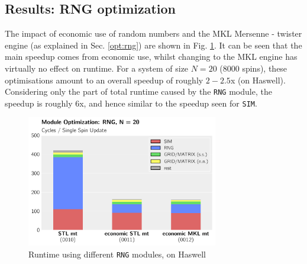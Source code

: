 \documentclass[letterpaper]{article}
\begin{document}
\subsection{Results: RNG optimization}\label{res:RNG}
The impact of economic use of random numbers and the MKL Mersenne - twister engine (as explained in Sec. \ref{opt:rng}) are shown in Fig. \ref{RNG:Has:20}. \newline
It can be seen that the main speedup comes from economic use, whilst changing to the MKL engine has virtually no effect on runtime. \newline
For a system of size $N = 20$ ($8000$ spins), these optimisations amount to an overall speedup of roughly $2 - 2.5$x (on Haswell). Considering only the part of total runtime caused by the \texttt{RNG} module, the speedup is roughly $6$x, and hence similar to the speedup seen for \texttt{SIM}.
	\begin{figure}[h]\centering
	  \includegraphics[width = 8.36cm]{plots/dg_20_0.pdf}
	  \caption{Runtime using different \texttt{RNG} modules, on Haswell}
	  \label{RNG:Has:20}
	\end{figure}
\end{document}
